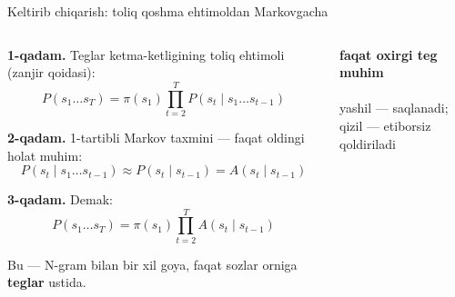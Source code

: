 \documentclass[aspectratio=169,11pt]{beamer}
\newcommand{\uzq}{\textquotesingle{}}
\begin{document}
\begin{frame}{Keltirib chiqarish: to\uzq{}liq qo\uzq{}shma ehtimoldan Markovgacha}
\footnotesize

\begin{columns}[T,totalwidth=\textwidth]
\begin{column}{0.62\textwidth}
\textbf{1-qadam.} Teglar ketma-ketligining to\uzq{}liq ehtimoli (zanjir qoidasi):
\[
P(s_1\dots s_T)=\pi(s_1)\prod_{t=2}^{T} P(s_t\mid s_1\dots s_{t-1})
\]

\textbf{2-qadam.} 1-tartibli Markov taxmini --- faqat oldingi holat muhim:
\[
P(s_t\mid s_1\dots s_{t-1}) \approx P(s_t\mid s_{t-1}) = A(s_t\mid s_{t-1})
\]

\textbf{3-qadam.} Demak:
\[
P(s_1\dots s_T)=\pi(s_1)\prod_{t=2}^{T} A(s_t\mid s_{t-1})
\]

\vspace{2pt}
Bu --- N-gram bilan bir xil g\uzq{}oya, faqat so\uzq{}zlar o\uzq{}rniga \textbf{teglar} ustida.
\end{column}

\begin{column}{0.36\textwidth}
\centering
{\scriptsize \textbf{faqat oxirgi teg muhim}}\\[3pt]
\\[2pt]
{\scriptsize yashil --- saqlanadi;\\ qizil --- e\uzq{}tiborsiz qoldiriladi}
\end{column}
\end{columns}

\end{frame}
\end{document}
